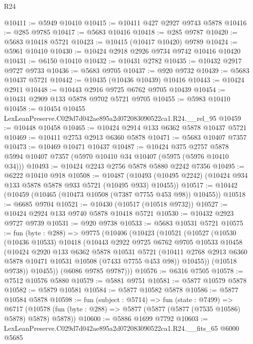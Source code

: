 \begin{lexlean}{R24}
\begin{coremodule}
@10411 := @5949 @10410
@10415 := @10411 @427 @2927 @9743 @5878
@10416 := @285 @9785
@10417 := @5683 @10416
@10418 := @285 @9787
@10420 := @5683 @10418 @5721
@10423 := @10415 (@10417 @10420) @9789
@10424 := @5961 @10410
@10430 := @10424 @2918 @2926 @9734 @9742 @10416 @10420
@10431 := @6150 @10410
@10432 := @10431 @2782
@10435 := @10432 @2917 @9727 @9733
@10436 := @5683 @9705
@10437 := @920 @9732
@10439 := @5683 @10437 @5721
@10442 := @10435 (@10436 @10439) @10416
@10443 := @10424 @2911
@10448 := @10443 @2916 @9725 @6762 @9705 @10439
@10454 := @10431 @2909 @133 @5878 @9702 @5721 @9705
@10455 := @5983 @10410
@10458 := @10454 @10455 LexLeanPreserve.C029d7d042ae895a2d072083090522ca1.R24.__rel_95
@10459 := @10448 @10458
@10465 := @10424 @2914 @133 @6362 @5878 @10437 @5721
@10469 := @10411 @2753 @2913 @6360 @5878
@10471 := @5683 @10407 @7357
@10473 := @10469 @10471 @10437
@10487 := @10424
    @375
    @2757
    @5878
    @5994
    @10407
    @7357
    (@5970 @10410 @34 @10407 (@5975 (@5976 @10410 @34)))
@10493 := @10424 @2243 @2756 @5878 @5880 @2242 @7356
@10495 := @6222 @10410 @918
@10508 := @10487
    (@10493 (@10495 @2242) (@10424 @934 @133 @5878 @5878 @933 @5721 (@10495 @933) @10455))
@10517 := @10442 (@10459 (@10465 (@10473 @10508 (@7387 @7755 @453 @98)) @10455))
@10518 := @6685 @9704
@10521 := @10430 (@10517 (@10518 @9732))
@10527 := @10424 @2924 @133 @9740 @5878 @10418 @5721
@10530 := @10432 @2923 @9727 @9739
@10531 := @920 @9738
@10533 := @5683 @10531 @5721
@10575 := fun (byte : @288) =>
  @9775
    (@10406
      (@10423
        (@10521
          (@10527
            (@10530
              (@10436 @10533)
              @10418
              (@10443
                @2922
                @9725
                @6762
                @9705
                @10533
                @10458
                (@10424
                  @2920
                  @133
                  @6362
                  @5878
                  @10531
                  @5721
                  (@10411 @2768 @2913 @6360 @5878 @10471 @10531 @10508 (@7433 @7755 @453 @98))
                  @10455))
              (@10518 @9738))
            @10455))
        (@6086 @9785 @9787)))
@10576 := @6316 @7505
@10578 := @7512 @10576 @5880
@10579 := @5881 @9751
@10581 := @5877 @10579 @5878
@10582 := @5879 @10581
@10584 := @5877 @10582 @5878
@10586 := @5877 @10584 @5878
@10598 := fun (subject : @5714) =>
  fun (state : @7499) =>
  @6717 (@10578 (fun (byte : @288) => @5877 (@5877 (@5877 (@7535 @10586) @5878) @5878) @5878))
@10600 := @5886 @1699 @7792
@10603 := LexLeanPreserve.C029d7d042ae895a2d072083090522ca1.R24.__fits_65 @6000 @5685

\end{coremodule}
\end{lexlean}
